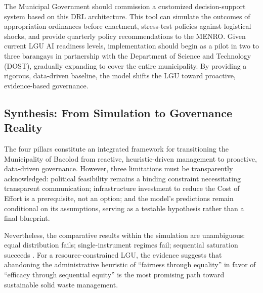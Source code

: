 The Municipal Government should commission a customized decision-support system based on this DRL architecture. This tool can simulate the outcomes of appropriation ordinances before enactment, stress-test policies against logistical shocks, and provide quarterly policy recommendations to the MENRO. Given current LGU AI readiness levels, implementation should begin as a pilot in two to three barangays in partnership with the Department of Science and Technology (DOST), gradually expanding to cover the entire municipality. By providing a rigorous, data-driven baseline, the model shifts the LGU toward proactive, evidence-based governance.

\subsection{Synthesis: From Simulation to Governance Reality}
The four pillars constitute an integrated framework for transitioning the Municipality of Bacolod from reactive, heuristic-driven management to proactive, data-driven governance. However, three limitations must be transparently acknowledged: political feasibility remains a binding constraint necessitating transparent communication; infrastructure investment to reduce the Cost of Effort is a prerequisite, not an option; and the model's predictions remain conditional on its assumptions, serving as a testable hypothesis rather than a final blueprint.

Nevertheless, the comparative results within the simulation are unambiguous: equal distribution fails; single-instrument regimes fail; sequential saturation succeeds \citep{Alphonso2024, Jimenez2025}. For a resource-constrained LGU, the evidence suggests that abandoning the administrative heuristic of ``fairness through equality'' in favor of ``efficacy through sequential equity'' is the most promising path toward sustainable solid waste management.